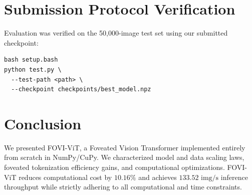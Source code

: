 \documentclass[10pt,conference]{IEEEtran}
\begin{document}
\section{Submission Protocol Verification}
Evaluation was verified on the 50,000-image test set using our submitted checkpoint:
\begin{verbatim}
bash setup.bash
python test.py \
  --test-path <path> \
  --checkpoint checkpoints/best_model.npz
\end{verbatim}

\begin{table}[h]
\centering
\caption{Verified Test Evaluation Results (Logs: test\_20260903\_180152.log)}
\label{tab:test_results}
\end{table}

\section{Conclusion}
We presented FOVI-ViT, a Foveated Vision Transformer implemented entirely from scratch in NumPy/CuPy. We characterized model and data scaling laws, foveated tokenization efficiency gains, and computational optimizations. FOVI-ViT reduces computational cost by $10.16\%$ and achieves $133.52\text{ img/s}$ inference throughput while strictly adhering to all computational and time constraints.
\end{document}
